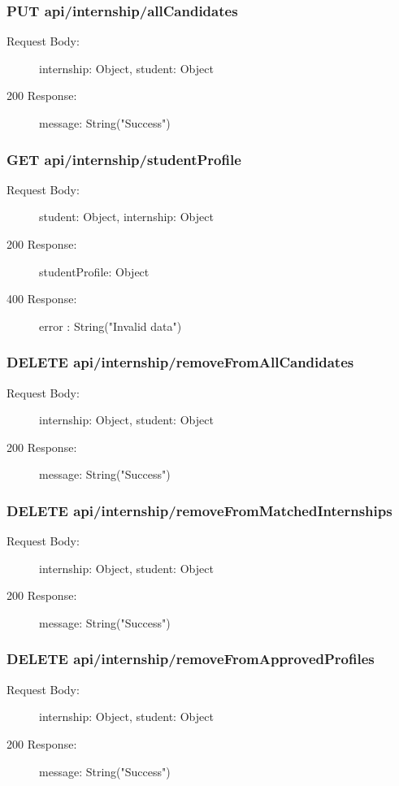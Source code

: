 \documentclass[a4paper,12pt]{article}
\begin{document}
\subsubsection*{PUT api/internship/allCandidates}
\begin{description}
    \item[Request Body:] internship: Object, student: Object
    \item[200 Response:] message: String("Success")
\end{description}

\subsubsection*{GET api/internship/studentProfile}
\begin{description}
    \item[Request Body:]  student: Object, internship: Object
    \item[200 Response:] studentProfile: Object
    \item[400 Response:] error : String("Invalid data")
\end{description}

\subsubsection*{DELETE api/internship/removeFromAllCandidates}
\begin{description}
    \item[Request Body:] internship: Object, student: Object
    \item[200 Response:] message: String("Success")
\end{description}

\subsubsection*{DELETE api/internship/removeFromMatchedInternships}
\begin{description}
    \item[Request Body:] internship: Object, student: Object
    \item[200 Response:] message: String("Success")
\end{description}

\subsubsection*{DELETE api/internship/removeFromApprovedProfiles}
\begin{description}
    \item[Request Body:] internship: Object, student: Object
    \item[200 Response:] message: String("Success")
\end{description}
\end{document}
